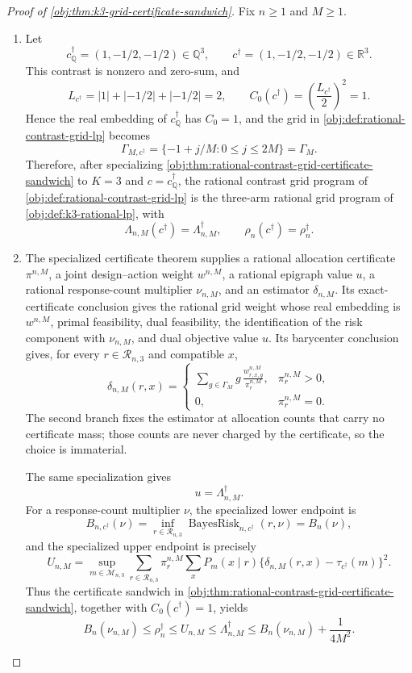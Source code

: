 \begin{proof}[Proof of \cref{obj:thm:k3-grid-certificate-sandwich}]
Fix \(n\geq 1\) and \(M\geq 1\).
\begin{enumerate}
\item Let
\[
c_{\mathbb Q}^\dagger=(1,-1/2,-1/2)\in\mathbb Q^3,
\qquad
c^\dagger=(1,-1/2,-1/2)\in\mathbb R^3 .
\]
This contrast is nonzero and zero-sum, and
\[
L_{c^\dagger}=|1|+|-1/2|+|-1/2|=2,
\qquad
C_0(c^\dagger)=\left(\frac{L_{c^\dagger}}2\right)^2=1 .
\]
Hence the real embedding of \(c_{\mathbb Q}^\dagger\) has \(C_0=1\), and the grid in \cref{obj:def:rational-contrast-grid-lp} becomes
\[
\Gamma_{M,c^\dagger}
=
\{-1+j/M:0\leq j\leq 2M\}
=
\Gamma_M .
\]
Therefore, after specializing \cref{obj:thm:rational-contrast-grid-certificate-sandwich} to \(K=3\) and \(c=c_{\mathbb Q}^\dagger\), the rational contrast grid program of \cref{obj:def:rational-contrast-grid-lp} is the three-arm rational grid program of \cref{obj:def:k3-rational-lp}, with
\[
\Lambda_{n,M}(c^\dagger)=\Lambda_{n,M}^\dagger,
\qquad
\rho_n(c^\dagger)=\rho_n^\dagger .
\]

\item The specialized certificate theorem supplies a rational allocation certificate \(\pi^{n,M}\), a joint design--action weight \(w^{n,M}\), a rational epigraph value \(u\), a rational response-count multiplier \(\nu_{n,M}\), and an estimator \(\delta_{n,M}\). Its exact-certificate conclusion gives the rational grid weight whose real embedding is \(w^{n,M}\), primal feasibility, dual feasibility, the identification of the risk component with \(\nu_{n,M}\), and dual objective value \(u\). Its barycenter conclusion gives, for every \(r\in\mathcal R_{n,3}\) and compatible \(x\),
\[
\delta_{n,M}(r,x)
=
\begin{cases}
\displaystyle
\sum_{g\in\Gamma_M}g\,\frac{w_{r,x,g}^{n,M}}{\pi_r^{n,M}},
& \pi_r^{n,M}>0,\\[1ex]
0,& \pi_r^{n,M}=0.
\end{cases}
\]
The second branch fixes the estimator at allocation counts that carry no certificate mass; those counts are never charged by the certificate, so the choice is immaterial.

The same specialization gives
\[
u=\Lambda_{n,M}^\dagger .
\]
For a response-count multiplier \(\nu\), the specialized lower endpoint is
\[
B_{n,c^\dagger}(\nu)
=
\inf_{r\in\mathcal R_{n,3}}
\operatorname{BayesRisk}_{n,c^\dagger}(r,\nu)
=
B_n(\nu),
\]
and the specialized upper endpoint is precisely
\[
U_{n,M}
=
\sup_{m\in\mathcal M_{n,3}}
\sum_{r\in\mathcal R_{n,3}}\pi_r^{n,M}
\sum_x
P_m(x\mid r)
\{\delta_{n,M}(r,x)-\tau_{c^\dagger}(m)\}^2 .
\]
Thus the certificate sandwich in \cref{obj:thm:rational-contrast-grid-certificate-sandwich}, together with \(C_0(c^\dagger)=1\), yields
\[
B_n(\nu_{n,M})
\le
\rho_n^\dagger
\le
U_{n,M}
\le
\Lambda_{n,M}^\dagger
\le
B_n(\nu_{n,M})+\frac{1}{4M^2}.
\]


\end{enumerate}
\end{proof}
